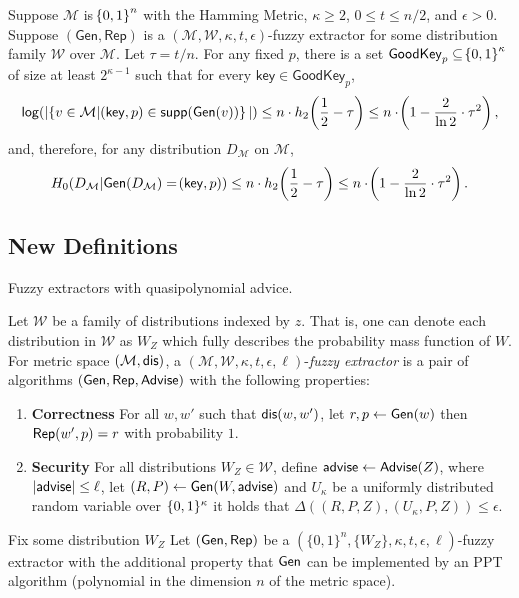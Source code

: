 \begin{lemma}
    \label{lem:smallgeneralviable}
    Suppose $\mathcal{M}$ is $\!\left\{ 0,1 \right\}^{n}$ with the Hamming Metric, $\kappa \geq 2$, $0 \leq t \leq n/2$, and $\epsilon > 0$. 
    Suppose $(\mathsf{Gen, Rep})$ is a $(\mathcal{M,W},\kappa, t, \epsilon)$-fuzzy extractor for some distribution family $\mathcal{W}$ over $\mathcal{M}$. 
    Let $\tau = t/n$. 
    For any fixed $p$, there is a set $\mathsf{GoodKey}_p \subseteq \!\left\{ 0,1 \right\}^{\kappa}$ of size at least $2^{\kappa - 1}$ such that for every $\mathsf{key} \in \mathsf{GoodKey}_p$,
    \[
        \mathsf{log}\!\left(|\!\left\{ v \in \mathcal{M}|\!\left(\mathsf{key}, p\right) \in \mathsf{supp}\!\left(\mathsf{Gen}(v)\right) \right\}|\right) \leq n \cdot h_2\!\left(\frac{1}{2} - \tau\right) \leq n \cdot \!\left(1 - \frac{2}{\ln{2}} \cdot \tau^{2}\right), 
    \]   
    and, therefore, for any distribution $D_{\mathcal{M}}$ on $\mathcal{M}$, 
    \[
        H_0\!\left(D_{\mathcal{M}}|\mathsf{Gen}\!\left(D_{\mathcal{M}}\right) = \!\left(\mathsf{key}, p\right)\right) \leq n \cdot h_2\!\left(\frac{1}{2} - \tau\right) \leq n \cdot \!\left(1 - \frac{2}{\ln{2}} \cdot \tau^{2}\right).
    \]   
\end{lemma}

\subsection{New Definitions}
Fuzzy extractors with quasipolynomial advice. 

\begin{definition}
Let $\mathcal{W}$ be a family of distributions indexed by $z$.  That is, one can denote each distribution in $\mathcal{W}$ as $W_Z$ which fully describes the probability mass function of $W$.  
For metric space $(\mathcal{M}, \mathsf{dis})$, a $(\mathcal{M}, \mathcal{W}, \kappa, t, \epsilon, \ell)$-\emph{fuzzy extractor} is a pair of algorithms $({\mathsf{Gen}}, {\mathsf{Rep}}, {\mathsf{Advise}})$ with the following properties:
\begin{enumerate} 
\itemsep0em
\item \textbf{Correctness} For all $w, w'$ such that $\mathsf{dis}(w, w')$, let $r, p \leftarrow {\ensuremath{\mathsf{Gen}}}(w)$ then ${\mathsf{Rep}}(w', p) = r$ with probability $1$. 
\item \textbf{Security} For all distributions $W_Z \in \mathcal{W}$, define ${\mathsf{advise}} \leftarrow {\ensuremath{\mathsf{Advise}}}(Z)$, where $|{\mathsf{advise}}| \le \ell$, let $(R, P) \leftarrow {\ensuremath{\mathsf{Gen}}}(W, {\mathsf{advise}})$ and $U_\kappa$ be a uniformly distributed random variable over $\{0, 1\}^\kappa$ it holds that $\Delta((R, P, Z), (U_\kappa, P, Z))\le \epsilon.$
\end{enumerate}
\end{definition}

\begin{definition}
Fix some distribution $W_Z$ Let $({\mathsf{Gen}}, {\mathsf{Rep}})$ be a $(\{0,1\}^n, \{W_Z\}, \kappa, t, \epsilon, \ell)$-fuzzy extractor with the additional property that ${\mathsf{Gen}}$ can be implemented by an PPT algorithm (polynomial in the dimension $n$ of the metric space).
\end{definition}

